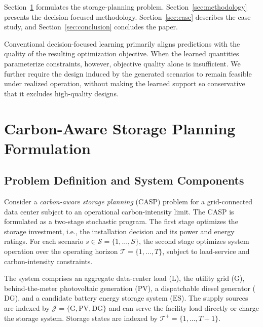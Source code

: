 \documentclass[times]{elsarticle}
\begin{document}
Section~\ref{sec:formulation} formulates the storage-planning problem.
Section~\ref{sec:methodology} presents the decision-focused methodology.
Section~\ref{sec:case} describes the case study, and
Section~\ref{sec:conclusion} concludes the paper.

\noindent\colorbox{yellow!20}{%
\parbox{\dimexpr\linewidth-2\fboxsep\relax}{%
Conventional decision-focused learning primarily aligns predictions with the
quality of the resulting optimization objective. When the learned quantities
parameterize constraints, however, objective quality alone is insufficient. We
further require the design induced by the generated scenarios to remain
feasible under realized operation, without making the learned support so
conservative that it excludes high-quality designs.%
}}

\section{Carbon-Aware Storage Planning Formulation}
\label{sec:formulation}

\subsection{Problem Definition and System Components}

Consider a \emph{carbon-aware storage planning} (CASP) problem for a
grid-connected data center subject to an operational carbon-intensity limit.
The CASP is formulated as a two-stage stochastic program. The first stage
optimizes the storage investment, i.e., the installation decision and its
power and energy ratings. For each scenario
$s\in\mathcal S=\{1,\ldots,S\}$, the second stage optimizes system operation
over the operating horizon $\mathcal T=\{1,\ldots,T\}$, subject to load-service
and carbon-intensity constraints.

The system comprises an aggregate data-center load ($\mathrm L$), the utility
grid ($\mathrm G$), behind-the-meter photovoltaic generation ($\mathrm{PV}$),
a dispatchable diesel generator ($\mathrm{DG}$), and a candidate battery energy
storage system ($\mathrm{ES}$). The supply sources are indexed by
$\mathcal J=\{\mathrm G,\mathrm{PV},\mathrm{DG}\}$ and can serve the facility
load directly or charge the storage system. Storage states are indexed by
$\mathcal T^+=\{1,\ldots,T+1\}$.
\end{document}
